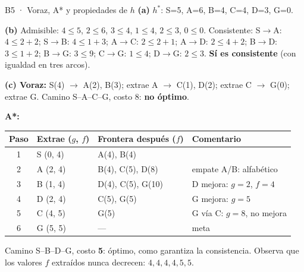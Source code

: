 \begin{solucion}{B5 · Voraz, A* y propiedades de $h$}
\textbf{(a)} $h^*$: S=5, A=6, B=4, C=4, D=3, G=0.

\textbf{(b)} Admisible: $4\le5$, $2\le6$, $3\le4$, $1\le4$, $2\le3$, $0\le0$. Consistente:
S$\to$A: $4\le2+2$; S$\to$B: $4\le1+3$; A$\to$C: $2\le2+1$; A$\to$D: $2\le4+2$; B$\to$D: $3\le1+2$;
B$\to$G: $3\le9$; C$\to$G: $1\le4$; D$\to$G: $2\le3$. \textbf{Sí es consistente} (con igualdad en tres arcos).

\textbf{(c) Voraz:} S(4) $\to$ A(2), B(3); extrae A $\to$ C(1), D(2); extrae C $\to$ G(0); extrae G.
Camino S–A–C–G, costo 8: \textbf{no óptimo}.

\textbf{A*:}
\begin{center}\small
\begin{tabular}{clll}
\toprule
Paso & Extrae ($g$, $f$) & Frontera después ($f$) & Comentario\\
\midrule
1 & S (0, 4) & A(4), B(4) & \\
2 & A (2, 4) & B(4), C(5), D(8) & empate A/B: alfabético\\
3 & B (1, 4) & D(4), C(5), G(10) & D mejora: $g=2$, $f=4$\\
4 & D (2, 4) & C(5), G(5) & G mejora: $g=5$\\
5 & C (4, 5) & G(5) & G vía C: $g=8$, no mejora\\
6 & G (5, 5) & — & meta\\
\bottomrule
\end{tabular}
\end{center}
Camino S–B–D–G, costo \textbf{5}: óptimo, como garantiza la consistencia. Observa que los valores
$f$ extraídos nunca decrecen: $4,4,4,4,5,5$.
\end{solucion}

